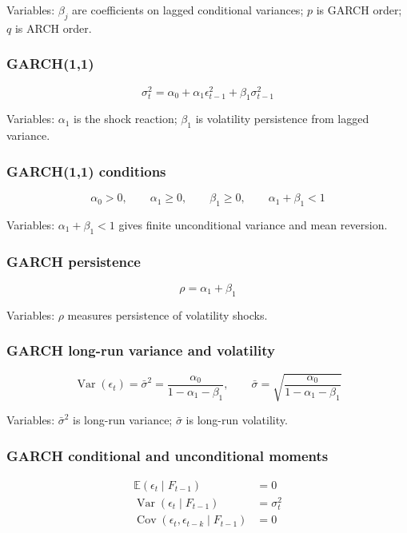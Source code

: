 \documentclass[
  8pt,
  twocolumn]{extarticle}
\begin{document}
Variables: \(\beta_j\) are coefficients on lagged conditional variances;
\(p\) is GARCH order; \(q\) is ARCH order.

\subsubsection{GARCH(1,1)}\label{garch11}

\[
\sigma_t^2=\alpha_0+\alpha_1\epsilon_{t-1}^2+\beta_1\sigma_{t-1}^2
\]

Variables: \(\alpha_1\) is the shock reaction; \(\beta_1\) is volatility
persistence from lagged variance.

\subsubsection{GARCH(1,1) conditions}\label{garch11-conditions}

\[
\alpha_0>0,\qquad \alpha_1\ge0,\qquad \beta_1\ge0,\qquad \alpha_1+\beta_1<1
\]

Variables: \(\alpha_1+\beta_1<1\) gives finite unconditional variance
and mean reversion.

\subsubsection{GARCH persistence}\label{garch-persistence}

\[
\rho=\alpha_1+\beta_1
\]

Variables: \(\rho\) measures persistence of volatility shocks.

\subsubsection{GARCH long-run variance and
volatility}\label{garch-long-run-variance-and-volatility}

\[
\operatorname{Var}(\epsilon_t)=\bar\sigma^2=\frac{\alpha_0}{1-\alpha_1-\beta_1},\qquad
\bar\sigma=\sqrt{\frac{\alpha_0}{1-\alpha_1-\beta_1}}
\]

Variables: \(\bar\sigma^2\) is long-run variance; \(\bar\sigma\) is
long-run volatility.

\subsubsection{GARCH conditional and unconditional
moments}\label{garch-conditional-and-unconditional-moments}

\[
\begin{aligned}
\mathbb E(\epsilon_t\mid F_{t-1})&=0\\
\operatorname{Var}(\epsilon_t\mid F_{t-1})&=\sigma_t^2\\
\operatorname{Cov}(\epsilon_t,\epsilon_{t-k}\mid F_{t-1})&=0
\end{aligned}
\]
\end{document}

